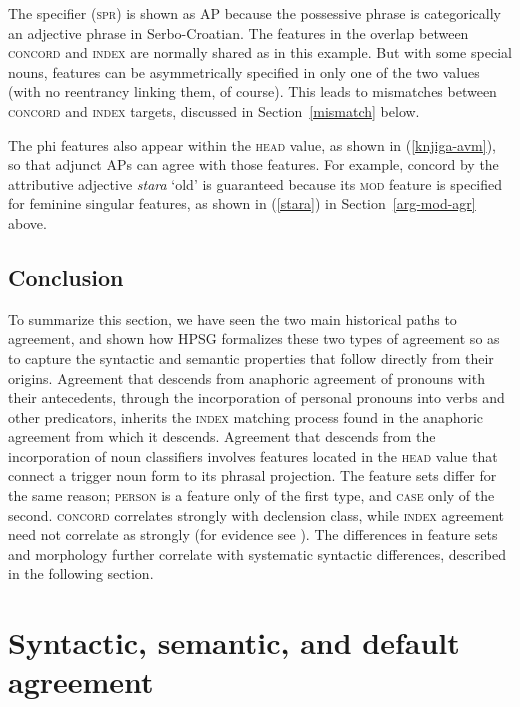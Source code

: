 \documentclass[output=paper
                ,modfonts
                ,nonflat
	        ,collection
	        ,collectionchapter
	        ,collectiontoclongg
 	        ,biblatex
                ,babelshorthands
                ,newtxmath
                ,draftmode
                ,colorlinks, citecolor=brown
]{./langsci/langscibook}
\begin{document}
{\noindent
The specifier (\textsc{spr}) is shown as AP because the possessive phrase is categorically an adjective phrase in Serbo-Croatian.  The features in the overlap between \textsc{concord} and \textsc{index} are normally shared as in this example.  But with some special nouns, features can be asymmetrically specified in only one of the two values (with no reentrancy linking them, of course).  This leads to mismatches between \textsc{concord} and \textsc{index} targets, discussed in Section~\ref{mismatch} below.

The phi features also appear within the \textsc{head} value, as shown in (\ref{knjiga-avm}), so that adjunct APs can agree with those features.  For example, concord by the attributive adjective \textit{stara} `old' is guaranteed because its \textsc{mod} feature is specified for feminine singular features, as shown in (\ref{stara}) in Section~\ref{arg-mod-agr} above.   


\subsection{Conclusion}
To summarize this section, we have seen the two main historical paths to agreement, and shown how HPSG formalizes these two types of agreement so as to capture the syntactic and semantic properties that follow directly from their origins.  Agreement that descends from anaphoric agreement of pronouns with their antecedents, through the incorporation of personal pronouns into verbs and other predicators, inherits the \textsc{index} matching process found in the anaphoric agreement from which it descends.  Agreement that descends from the incorporation of noun classifiers involves features located in the \textsc{head} value that connect a trigger noun form to its phrasal projection.  The feature sets differ for the same reason; \textsc{person} is a feature only of the first type, and \textsc{case} only of the second.  \textsc{concord} correlates strongly with declension class, while \textsc{index} agreement need not correlate as strongly (for evidence see \citealt[Chapter~2]{Wechsler+Zlatic:2003}).  The differences in feature sets and morphology further correlate with systematic syntactic differences, described in the following section.  


\section{Syntactic, semantic, and default agreement}
\label{pancake-sec}
 
}
\end{document}
